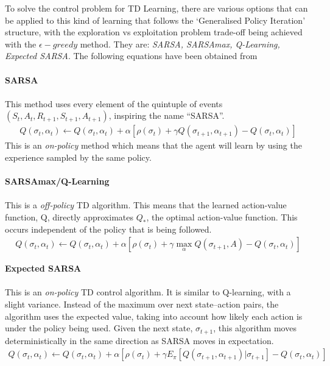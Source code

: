 \documentclass[ %
                    author={Ashwinder Khurana},
                supervisor={Prof Dave Cliff},
                    degree={MEng},
                     title={The Deeply Reinforced Trader},
                  subtitle={},
                      type={enterprise},
                      year={2020} ]{dissertation}
\begin{document}
{\noindent 
To solve the control problem for TD Learning, there are various options that can be applied to this kind of learning that follows the \enquote*{Generalised Policy Iteration} structure, with the exploration vs exploitation problem trade-off being achieved with the $\epsilon-greedy$ method. They are: \textit{SARSA, SARSAmax, Q-Learning, Expected SARSA}. The following equations have been obtained from \cite{TD-methods} 
\\
\\
\textbf{SARSA}
\\
\\
This method uses every element of the quintuple of events $(S_t, A_t, R_{t+1}, S_{t+1}, A_{t+1})$, inspiring the name \enquote{SARSA}. 
\begin{equation}
\label{SARSA}
\begin{split}
Q(\sigma_t, \alpha_t) \leftarrow Q(\sigma_t, \alpha_t) + \alpha[\rho(\sigma_t) + \gamma Q(\sigma_{t+1}, \alpha_{t+1}) - Q(\sigma_t, \alpha_t)]
\end{split}
\end{equation}
\noindent
This is an \textit{on-policy} method which means that the agent will learn by using the experience sampled by the same policy. 
\\
\\
\noindent
\textbf{SARSAmax/Q-Learning}
\\
\\
This is a \textit{off-policy} TD algorithm. This means that the learned action-value function, Q, directly approximates $Q_*$, the optimal action-value function. This occurs independent of the policy that is being followed. 
\begin{equation}
\label{Q-learning}
\begin{split}
Q(\sigma_t, \alpha_t) \leftarrow Q(\sigma_t, \alpha_t) + \alpha[\rho(\sigma_t) + \gamma \max\limits^{}_{\alpha}Q(\sigma_{t+1}, A) - Q(\sigma_t, \alpha_t)]
\end{split}
\end{equation}

\noindent
\textbf{Expected SARSA}
\\
\\
This is an \textit{on-policy} TD control algorithm. It is similar to Q-learning, with a slight variance. Instead of the maximum over next state–action pairs,  the algorithm uses the expected value, taking into account how likely each action is under the policy being used. Given the next state, $\sigma_{t+1}$, this algorithm moves deterministically in the same direction as SARSA moves in expectation. 
\begin{equation}
\label{SARSA}
\begin{split}
Q(\sigma_t, \alpha_t) \leftarrow Q(\sigma_t, \alpha_t) + \alpha[\rho(\sigma_t) + \gamma E_\pi[Q(\sigma_{t+1}, \alpha_{t+1}) | \sigma_{t+1}] - Q(\sigma_t, \alpha_t)]
\end{split}
\end{equation}

}
\end{document}
